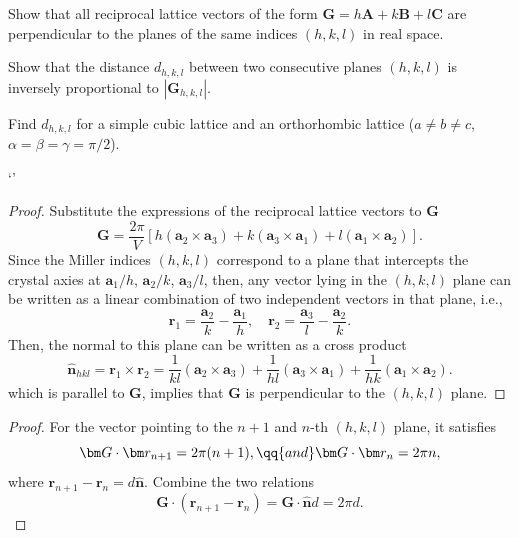 \begin{problem}\leavevmode
  \begin{enumext}
    \item Show that all reciprocal lattice vectors of the form
    $\bm G = h\bm A + k\bm B + l\bm C$ are perpendicular to the planes of the
    same indices $(h, k, l)$ in real space.
    \item Show that the distance $d_{h,k,l}$ between two consecutive planes
    $(h, k, l)$ is inversely proportional to $|\bm G_{h,k,l}|$.
    \item Find $d_{h,k,l}$ for a simple cubic lattice and an orthorhombic
    lattice ($a \neq b \neq c$, $\alpha = \beta = \gamma = \pi/2$).
  \end{enumext}
\end{problem}
\begin{solution}\leavevmode`'
  \begin{enumext}
    \item \begin{proof}
      Substitute the expressions of the reciprocal lattice vectors to $\bm G$
      \[
        \bm G = \frac{2\pi}{V}
           [h(\bm a_2 \times \bm a_3) + k(\bm a_3 \times \bm a_1)
          + l(\bm a_1 \times \bm a_2)].
      \]
      Since the Miller indices $(h, k, l)$ correspond to a plane that
      intercepts the crystal axies at $\bm a_1/h$, $\bm a_2/k$, $\bm a_3/l$,
      then, any vector lying in the $(h, k, l)$ plane can be written as a linear
      combination of two independent vectors in that plane, i.e.,
      \[
        \bm r_1 = \frac{\bm a_2}{k} - \frac{\bm a_1}{h}, \quad
        \bm r_2 = \frac{\bm a_3}{l} - \frac{\bm a_2}{k}.
      \]
      Then, the normal to this plane can be written as a cross product
      \[
        \hat{\bm n}_{hkl} = \bm r_1 \times \bm r_2
      = \frac{1}{kl} (\bm a_2 \times \bm a_3) +
        \frac{1}{hl} (\bm a_3 \times \bm a_1) +
        \frac{1}{hk} (\bm a_1 \times \bm a_2).
      \]
      which is parallel to $\bm G$, implies that $\bm G$ is perpendicular to the
      $(h, k, l)$ plane.
    \end{proof}
    \item \begin{proof}
    For the vector pointing to the $n + 1$ and $n$-th $(h, k, l)$ plane,
    it satisfies
    \[
      \bm G \cdot \bm r_{n+1} = 2\pi(n + 1), \qq{and}
      \bm G \cdot \bm r_n = 2\pi n,
    \]
    where $\bm r_{n+1} - \bm r_n = d \hat{\bm n}$. Combine the two relations
    \[
      \bm G \cdot(\bm r_{n+1} - \bm r_n) = \bm G \cdot \bm{\hat n} d = 2\pi d.
\]
\end{proof}
\end{enumext}
\end{solution}
